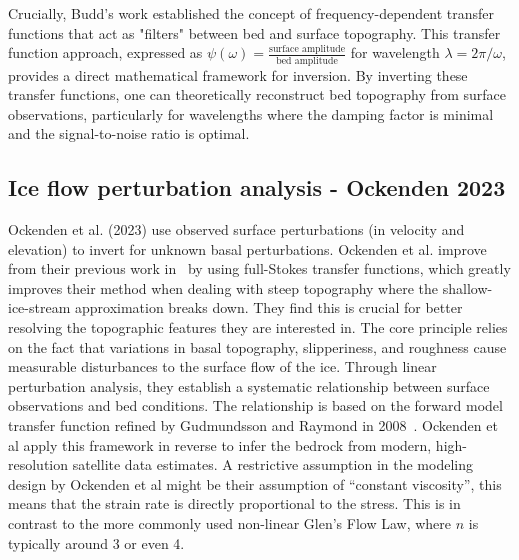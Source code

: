 Crucially, Budd's work established the concept of frequency-dependent transfer functions that act as "filters" between bed and surface topography. This transfer function approach, expressed as $\psi(\omega) = \frac{\text{surface amplitude}}{\text{bed amplitude}}$ for wavelength $\lambda = 2\pi/\omega$, provides a direct mathematical framework for inversion. By inverting these transfer functions, one can theoretically reconstruct bed topography from surface observations, particularly for wavelengths where the damping factor is minimal and the signal-to-noise ratio is optimal.

\subsection{Ice flow perturbation analysis - Ockenden 2023}
Ockenden et al. (2023) use observed surface perturbations (in velocity and elevation) to invert for unknown basal perturbations. Ockenden et al. improve from their previous work in~\cite{Ockenden_2022} by using full-Stokes transfer functions, which greatly improves their method when dealing with steep topography where the shallow-ice-stream approximation breaks down. They find this is crucial for better resolving the topographic features they are interested in. The core principle relies on the fact that variations in basal topography, slipperiness, and roughness cause measurable disturbances to the surface flow of the ice. Through linear perturbation analysis, they establish a systematic relationship between surface observations and bed conditions. The relationship is based on the forward model transfer function refined by Gudmundsson and Raymond in 2008~\cite{Gudmundsson_2008}. 
Ockenden et al apply this framework in reverse to infer the bedrock from modern, high-resolution satellite data estimates. A restrictive assumption in the modeling design by Ockenden et al might be their assumption of ``constant viscosity'', this means that the strain rate is directly proportional to the stress. This is in contrast to the more commonly used non-linear Glen's Flow Law, where $n$ is typically around 3 or even 4.

